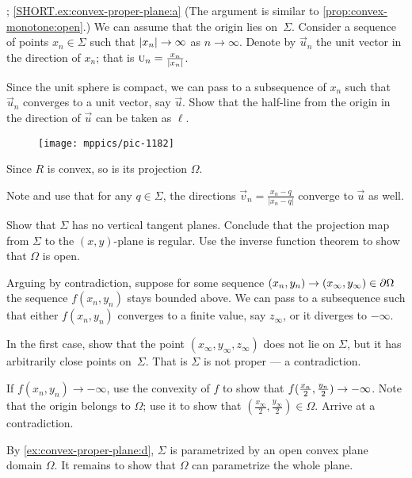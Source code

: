 \begin{multicols}{2}
\parbf{\ref{ex:convex-proper-plane}}; \ref{SHORT.ex:convex-proper-plane:a}
(The argument is similar to \ref{prop:convex-monotone:open}.)
We can assume that the origin lies on~$\Sigma$.
Consider a sequence of points $x_n\in \Sigma$ such that $|x_n|\z\to \infty$ as $n\to \infty$.
Denote by $\vec u_n$ the unit vector in the direction of $x_n$; that is $\vec u_n\z=\tfrac{x_n}{|x_n|}$.


Since the unit sphere is compact, we can pass to a subsequence of $x_n$ such that $\vec u_n$ converges to a unit vector, say $\vec u$.
Show that the half-line from the origin in the direction of $\vec u$ can be taken as $\ell$.

\begin{wrapfigure}{r}{29 mm}
\vskip-8mm
\centering
\texttt{[image: mppics/pic-1182]}
\vskip-3mm
\end{wrapfigure}

Since $R$ is convex, so is its projection $\Omega$.

Note and use that for any $q\in \Sigma$, the directions $\vec v_n=\tfrac{x_n-q}{|x_n-q|}$ converge to $\vec u$ as well.

Show that $\Sigma$ has no vertical tangent planes.
Conclude that the projection map from $\Sigma$ to the $(x,y)$-plane is regular.
Use the inverse function theorem to show that $\Omega$ is open.


Arguing by contradiction, suppose for some sequence $(x_n,y_n)\z\to(x_\infty,y_\infty)\in \partial\Omega$ the sequence $f(x_n,y_n)$ stays bounded above.
We can pass to a subsequence such that either $f(x_n,y_n)$ converges to a finite value, say $z_\infty$, or it diverges to $-\infty$.

In the first case, show that the point $(x_\infty, y_\infty,z_\infty)$ does not lie on $\Sigma$, but it has arbitrarily close points on~$\Sigma$.
That is $\Sigma$ is not proper --- a contradiction.

If $f(x_n,y_n)\to -\infty$, use the convexity of $f$ to show that $f(\tfrac{x_n}2 ,\tfrac{y_n}2)\z\to -\infty$.
Note that the origin belongs to $\Omega$;
use it to show that $(\tfrac{x_\infty}2, \tfrac{y_\infty}2)\in\Omega$.
Arrive at a contradiction.

By \ref{ex:convex-proper-plane:d}, $\Sigma$ is parametrized by an open convex plane domain $\Omega$.
It remains to show that $\Omega$ can parametrize the whole plane.


\end{multicols}
